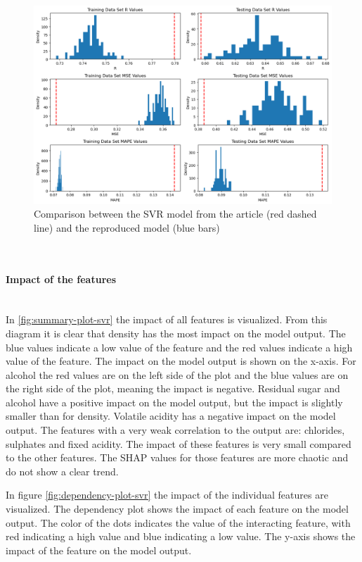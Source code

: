 \documentclass{article}
\newcommand{\subsubsubsection}[1]{%
  \paragraph{#1}\mbox{}\\}
\begin{document}
\begin{figure}
\centering
\includegraphics[width=\linewidth]{figures/SVR_reproduce_the_results.png}
\caption{Comparison between the SVR model from the article (red dashed line) and the reproduced model (blue bars)}
\label{fig:Reproduce-SVR-the-results}
\end{figure}

\subsubsubsection{Impact of the features}
In \autoref{fig:summary-plot-svr} the impact of all features is visualized.
From this diagram it is clear that density has the most impact on the model output.
The blue values indicate a low value of the feature and the red values indicate a high value of the feature.
The impact on the model output is shown on the x-axis.
For alcohol the red values are on the left side of the plot and the blue values are on the right side of the plot, meaning the impact is negative.
Residual sugar and alcohol have a positive impact on the model output, but the impact is slightly smaller than for density.
Volatile acidity has a negative impact on the model output.
The features with a very weak correlation to the output are: chlorides, sulphates and fixed acidity.
The impact of these features is very small compared to the other features.
The SHAP values for those features are more chaotic and do not show a clear trend.

In figure \autoref{fig:dependency-plot-svr} the impact of the individual features are visualized.
The dependency plot shows the impact of each feature on the model output.
The color of the dots indicates the value of the interacting feature, with red indicating a high value and blue indicating a low value.
The y-axis shows the impact of the feature on the model output.
\end{document}
